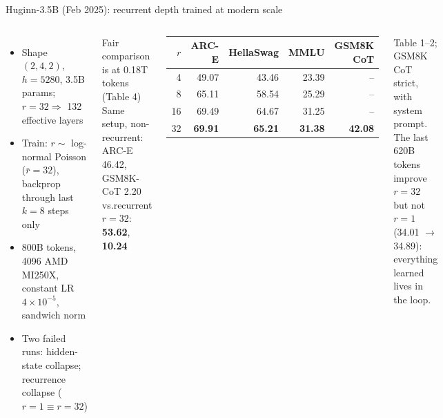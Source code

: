 \documentclass[aspectratio=169,10pt]{beamer}
\newcommand{\HL}[1]{\textcolor{emphasis}{#1}}
\begin{document}
\begin{frame}{Huginn-3.5B (Feb 2025): recurrent depth trained at modern scale}
  \begin{columns}[T]
      \begin{itemize}
        \item Shape $(2,4,2)$, $h = 5280$, 3.5B params; $r=32 \Rightarrow$ 132 effective layers
        \item Train: $r \sim$ log-normal Poisson ($\bar r=32$), \HL{backprop through last $k=8$ steps only}
        \item 800B tokens, 4096 AMD MI250X, constant LR $4\times10^{-5}$, sandwich norm
        \item Two failed runs: hidden-state collapse; recurrence collapse ($r{=}1 \equiv r{=}32$)
      \end{itemize}
      \begin{alertblock}{Fair comparison is at 0.18T tokens (Table 4)}
        Same setup, non-recurrent: ARC-E 46.42, GSM8K-CoT 2.20 \quad vs.\quad recurrent $r{=}32$: \textbf{53.62}, \textbf{10.24}
      \end{alertblock}
      \vspace{4pt}
      \begin{center}
      \small
      \begin{tabular}{@{}rrrrr@{}}
        \toprule
        $r$ & ARC-E & HellaSwag & MMLU & GSM8K CoT \\
        \midrule
        4  & 49.07 & 43.46 & 23.39 & -- \\
        8  & 65.11 & 58.54 & 25.29 & -- \\
        16 & 69.49 & 64.67 & 31.25 & -- \\
        \rowcolor{positive!12} 32 & \textbf{69.91} & \textbf{65.21} & \textbf{31.38} & \textbf{42.08} \\
        \bottomrule
      \end{tabular}
      \end{center}
      {\small Table 1--2; GSM8K CoT strict, with system prompt.}\\[4pt]
      \small The last 620B tokens improve $r{=}32$ but not $r{=}1$ (34.01 $\to$ 34.89): everything learned lives in the loop.
  \end{columns}
\end{frame}
\end{document}
